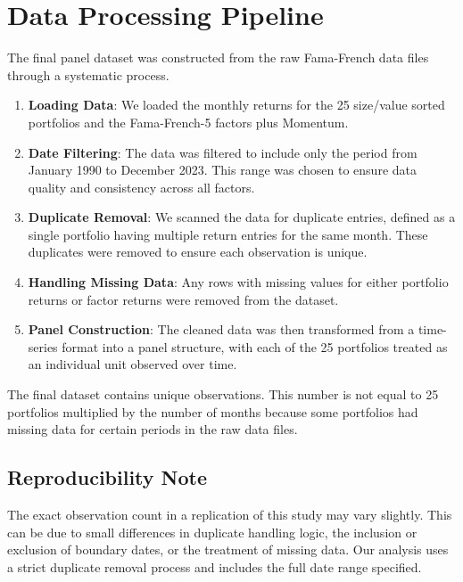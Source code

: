 \section*{Data Processing Pipeline}
The final panel dataset was constructed from the raw Fama-French data files through a systematic process.
\begin{enumerate}
    \item \textbf{Loading Data}: We loaded the monthly returns for the 25 size/value sorted portfolios and the Fama-French-5 factors plus Momentum.
    \item \textbf{Date Filtering}: The data was filtered to include only the period from January 1990 to December 2023. This range was chosen to ensure data quality and consistency across all factors.
    \item \textbf{Duplicate Removal}: We scanned the data for duplicate entries, defined as a single portfolio having multiple return entries for the same month. These duplicates were removed to ensure each observation is unique.
    \item \textbf{Handling Missing Data}: Any rows with missing values for either portfolio returns or factor returns were removed from the dataset.
    \item \textbf{Panel Construction}: The cleaned data was then transformed from a time-series format into a panel structure, with each of the 25 portfolios treated as an individual unit observed over time.
\end{enumerate}
The final dataset contains \RealTotalObservations{} unique observations. This number is not equal to 25 portfolios multiplied by the number of months because some portfolios had missing data for certain periods in the raw data files.

\subsection*{Reproducibility Note}
The exact observation count in a replication of this study may vary slightly. This can be due to small differences in duplicate handling logic, the inclusion or exclusion of boundary dates, or the treatment of missing data. Our analysis uses a strict duplicate removal process and includes the full date range specified.

